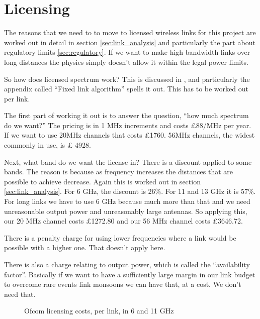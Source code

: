 \section{Licensing}

The reasons that we need to to move to licensed wireless links for
this project are worked out in detail in section
\ref{sec:link_analysis} and particularly the part about regulatory
limits \ref{sec:regulatory}. If we want to make high bandwidth links
over long distances the physics simply doesn't allow it within the
legal power limits.

So how does licensed spectrum work? This is discussed in
\cite{OfcomSpectrum}, and particularly the appendix called ``Fixed
link algorithm'' spells it out. This has to be worked out per link.

The first part of working it out is to answer the question, ``how much
spectrum do we want?'' The pricing is in 1 MHz increments and costs
£88/MHz per year. If we want to use 20MHz channels that costs
\pounds 1760. 56MHz channels, the widest commonly in use, is \pounds 
4928.

Next, what band do we want the license in? There is a discount applied
to some bands. The reason is because as frequency increases the
distances that are possible to achieve decrease. Again this is worked
out in section \ref{sec:link_analysis}. For 6 GHz, the discount is
26\%. For 11 and 13 GHz it is 57\%. For long links we have to use 6
GHz because much more than that and we need unreasonable output power
and unreasonably large antennas. So applying this, our 20 MHz channel
costs \pounds 1272.80 and our 56 MHz channel costs \pounds 3646.72.

There is a penalty charge for using lower frequencies where a link
would be possible with a higher one. That doesn't apply here.

There is also a charge relating to output power, which is called the
``availability factor''. Basically if we want to have a sufficiently
large margin in our link budget to overcome rare events link monsoons
we can have that, at a cost. We don't need that.

\begin{figure}[h]
  \begin{center}
    
  \end{center}
  \caption{Ofcom licensing costs, per link, in 6 and 11 GHz}
  \label{fig:license_costs}
\end{figure}

